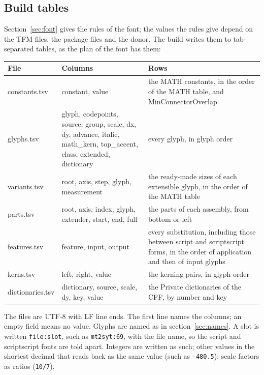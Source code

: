 \documentclass[10pt]{article}
\newcommand\code[1]{\texttt{#1}}
\begin{document}
\subsection{Build tables}\label{app:tables}

Section~\ref{sec:font} gives the rules of the font; the values the rules
give depend on the TFM files, the package files and the donor.  The
build writes them to tab-separated tables, as the plan of the font has
them:

\begin{longtable}{>{\ttfamily}l>{\ttfamily}p{}p{}}
\toprule
\normalfont File & \normalfont Columns & Rows \\
\midrule
\endhead
constants.tsv & constant, value & the MATH constants, in the order of
  the MATH table, and MinConnectorOverlap \\
glyphs.tsv & glyph, codepoints, source, group, scale, dx, dy, advance,
  italic, math\_kern, top\_accent, class, extended, dictionary & every
  glyph, in glyph order \\
variants.tsv & root, axis, step, glyph, measurement & the ready-made
  sizes of each extensible glyph, in the order of the MATH table \\
parts.tsv & root, axis, index, glyph, extender, start, end, full & the
  parts of each assembly, from bottom or left \\
features.tsv & feature, input, output & every substitution, including
  those between script and scriptscript forms, in the order of
  application and then of input glyphs \\
kerns.tsv & left, right, value & the kerning pairs, in glyph order \\
dictionaries.tsv & dictionary, source, scale, dy, key, value & the
  Private dictionaries of the CFF, by number and key \\
\bottomrule
\end{longtable}

The files are UTF-8 with LF line ends.  The first line names the
columns; an empty field means no value.  Glyphs are named as in
section~\ref{sec:names}.  A slot is written \code{file:slot}, such as
\code{mt2syt:69}, with the file name, so the script and scriptscript
fonts are told apart.  Integers are written as such; other values in the
shortest decimal that reads back as the same value (such as
\code{-480.5}); scale factors as ratios (\code{10/7}).
\end{document}
